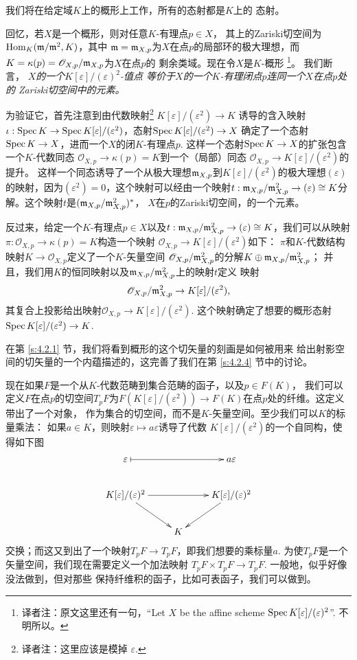 我们将在给定域$K$上的概形上工作，所有的态射都是$K$上的
态射。

回忆，若$X$是一个概形，则对任意$K$-有理点$p\in X$，
其上的Zariski切空间为$\operatorname{Hom}_K(\mathfrak{m}/\mathfrak{m}^2,K)$，其中
$\mathfrak{m}=\mathfrak{m}_{X,p}$为$X$在点$p$的局部环的极大理想，而
$K=\kappa(p)=\mathscr O_{X,p}/\mathfrak{m}_{X,p}$为$X$在点$p$的
剩余类域。现在令$X$是$K$-概形%
\footnote{译者注：原文这里还有一句，“Let $X$ be the
affine scheme $\operatorname{Spec} K[\varepsilon]/(\varepsilon)^2$”.
不明所以。}。%
我们断言，
\textit{$X$的一个$K[\varepsilon]/(\varepsilon)^2$-值点
等价于$X$的一个$K$-有理闭点$p$连同一个$X$在点$p$处的
Zariski切空间中的元素。}


为验证它，首先注意到由代数映射\footnote{译者注：这里应该是模掉
$\varepsilon$.}%
$K[\varepsilon]/(\varepsilon^2)
\to K$ 诱导的含入映射$\iota :\operatorname{Spec} K\to \operatorname{Spec} K[\varepsilon]/
(\varepsilon^2)$，态射$\operatorname{Spec} K[\varepsilon]/(\varepsilon^2)\to X$
确定了一个态射$\operatorname{Spec} K\to X$，进而一个$X$的闭$K$-有理点$p$.
这样一个态射$\operatorname{Spec} K\to X$的扩张包含一个$K$-代数同态
$\mathscr O_{X,p}\to \kappa(p)=K$到一个（局部）同态
$\mathscr O_{X,p}\to K[\varepsilon]/(\varepsilon^2)$的提升。
这样一个同态诱导了一个从极大理想$\mathfrak{m}_{X,p}$到$K[\varepsilon]/
(\varepsilon^2)$的极大理想$(\varepsilon)$的映射，因为$(\varepsilon^2)
=0$，这个映射可以经由一个映射$t:\mathfrak{m}_{X,p}/\mathfrak{m}_{X,p}^2\to (\varepsilon)
\cong K$分解。这个映射$t$是$(\mathfrak{m}_{X,p}/\mathfrak{m}_{X,p}^2)^*$，
$X$在$p$的Zariski切空间，的一个元素。

反过来，给定一个$K$-有理点$p\in X$以及$t:\mathfrak{m}_{X,p}/\mathfrak{m}_{X,p}^2\to
(\varepsilon)\cong K$，我们可以从映射$\pi:\mathscr O_{X,p}\to 
\kappa(p)=K$构造一个映射
$\mathscr O_{X,p}\to K[\varepsilon]/(\varepsilon^2)$如下：
$\pi$和$K$-代数结构映射$K\to \mathscr O_{X,p}$定义了一个$K$-矢量空间
$\mathscr O_{X,p}/\mathfrak{m}_{X,p}^2$的分解$K\oplus \mathfrak{m}_{X,p}/\mathfrak{m}_{X,p}^2$；
并且，我们用$K$的恒同映射以及$\mathfrak{m}_{X,p}/\mathfrak{m}_{X,p}^2$上的映射$t$定义
映射
\[
	\mathscr O_{X,p}/\mathfrak{m}_{X,p}^2\to K[\varepsilon]/(\varepsilon^2),
\]
其复合上投影给出映射$\mathscr O_{X,p}\to K[\varepsilon]/
(\varepsilon^2)$. 这个映射确定了想要的概形态射
$\operatorname{Spec} K[\varepsilon]/(\varepsilon^2)\to K$.

在第 \ref{s:4.2.1} 节，我们将看到概形的这个切矢量的刻画是如何被用来
给出射影空间的切矢量的一个内蕴描述的，这完善了我们在第 \ref{s:4.2.4}
节中的讨论。

现在如果$F$是一个从$K$-代数范畴到集合范畴的函子，以及$p\in F(K)$，
我们可以定义$F$在点$p$的切空间$T_pF$为$F(K[\varepsilon] /
(\varepsilon^{2})) \to F(K)$在点$p$处的纤维。这定义带出了一个对象，
作为集合的切空间，而不是$K$-矢量空间。至少我们可以$K$的标量乘法：
如果$a\in K$，则映射$\varepsilon\mapsto a\varepsilon$诱导了代数
$K[\varepsilon]/(\varepsilon^2)$的一个自同构，使得如下图
\[
	\xymatrix{
	\varepsilon \ar@{|->}[rr] &  & a\varepsilon\\
	K[\varepsilon]/(\varepsilon)^2 \ar[rr]\ar[rd]& & K[\varepsilon]/(\varepsilon)^2 \ar[ld]\\
	& K &
	}
\]
交换；而这又到出了一个映射$T_pF\to T_pF$，即我们想要的乘标量$a$.
为使$T_pF$是一个矢量空间，我们现在需要定义一个加法映射
$T_pF \times T_pF \to T_pF$. 一般地，似乎好像没法做到，但对那些
保持纤维积的函子，比如可表函子，我们可以做到。

